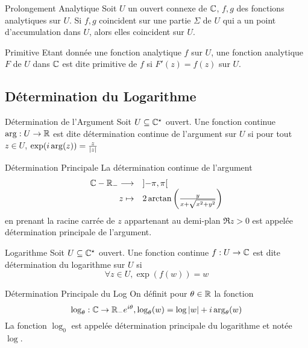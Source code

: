 \documentclass{cours}
\begin{document}
\begin{théorème}{Prolongement Analytique}{}
    Soit $U$ un ouvert connexe de $\mathbb{C}$, $f, g$ des fonctions analytiques sur $U$. Si $f, g$ coincident sur une partie $\Sigma$ de $U$ qui a un point d'accumulation dans $U$, alors elles coincident sur $U$. 
\end{théorème}

\begin{définition}{Primitive}{}
    Etant donnée une fonction analytique $f$ sur $U$, une fonction analytique $F$ de $U$ dans $\mathbb{C}$ est dite primitive de $f$ si $F'(z) = f(z)$ sur $U$. 
\end{définition}

\subsection{Détermination du Logarithme}
\begin{définition}{Détermination de l'Argument}{}
    Soit $U \subseteq \mathbb{C}^{\star}$ ouvert. Une fonction continue $\arg : U \to \mathbb{R}$ est dite détermination continue de l'argument sur $U$ si pour tout $z \in U$, $\exp(i\arg(z))=\frac{z}{\left|z\right|}$
\end{définition}
\begin{définition}{Détermination Principale}{}
    La détermination continue de l'argument 
    \[
        \begin{array}{rl}
            \mathbb{C} - \mathbb{R}_{-} \longrightarrow & \left] - \pi, \pi \right[\\
            z \mapsto & 2\arctan\left(\frac{y}{x + \sqrt{x^{2} + y^{2}}}\right)
        \end{array}
    \]
    en prenant la racine carrée de $z$ appartenant au demi-plan $\Re z > 0$ est appelée détermination principale de l'argument.
\end{définition}
\begin{définition}{Logarithme}{}
    Soit $U \subseteq \mathbb{C}^{\star}$ ouvert. Une fonction continue $f : U \to \mathbb{C}$ est dite détermination du logarithme sur $U$ si 
    \[
        \forall z \in U, \exp(f(w)) = w
    \]
\end{définition}

\begin{définition}{Détermination Principale du Log}{}
    On définit pour $\theta \in \mathbb{R}$ la fonction
    \[
        \log_{\theta} : \mathbb{C} \to \mathbb{R}_{-}e^{i\theta}, \log_{\theta}(w)=\log \left|w\right| + i\arg_{\theta}(w)
    \]
    La fonction $\log_{0}$ est appelée détermination principale du logarithme et notée $\log$. 
\end{définition}
\end{document}
